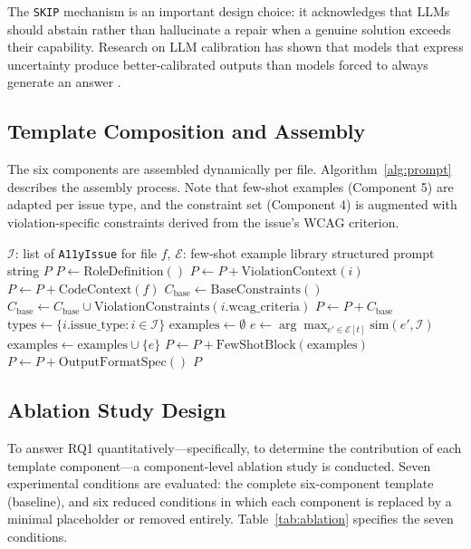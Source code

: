 \noindent
The \texttt{SKIP} mechanism is an important design choice: it acknowledges that
LLMs should abstain rather than hallucinate a repair when a genuine solution
exceeds their capability.  Research on LLM calibration has shown that models
that express uncertainty produce better-calibrated outputs than models forced
to always generate an answer \cite{kadavath2022}.

\subsection{Template Composition and Assembly}

The six components are assembled dynamically per file.  Algorithm~\ref{alg:prompt}
describes the assembly process.  Note that few-shot examples (Component 5) are
adapted per issue type, and the constraint set (Component 4) is augmented with
violation-specific constraints derived from the issue's WCAG criterion.

\begin{algorithm}[htbp]
\caption{Prompt Assembly Algorithm}
\label{alg:prompt}
\begin{algorithmic}[1]
\Require $\mathcal{I}$: list of \texttt{A11yIssue} for file $f$, $\mathcal{E}$: few-shot example library
\Ensure structured prompt string $P$
\State $P \gets \text{RoleDefinition}()$
  \State $P \gets P + \text{ViolationContext}(i)$
\EndFor
\State $P \gets P + \text{CodeContext}(f)$
\State $C_{\text{base}} \gets \text{BaseConstraints}()$
  \State $C_{\text{base}} \gets C_{\text{base}} \cup \text{ViolationConstraints}(i.\text{wcag\_criteria})$
\EndFor
\State $P \gets P + C_{\text{base}}$
\State $\text{types} \gets \{i.\text{issue\_type} : i \in \mathcal{I}\}$
\State $\text{examples} \gets \emptyset$
  \State $e \gets \arg\max_{e' \in \mathcal{E}[t]} \text{sim}(e', \mathcal{I})$
  \State $\text{examples} \gets \text{examples} \cup \{e\}$
\EndFor
\State $P \gets P + \text{FewShotBlock}(\text{examples})$
\State $P \gets P + \text{OutputFormatSpec}()$
\State \Return $P$
\end{algorithmic}
\end{algorithm}

\subsection{Ablation Study Design}

To answer RQ1 quantitatively—specifically, to determine the contribution of
each template component—a component-level ablation study is conducted.  Seven
experimental conditions are evaluated: the complete six-component template
(baseline), and six reduced conditions in which each component is replaced
by a minimal placeholder or removed entirely.  Table~\ref{tab:ablation}
specifies the seven conditions.

